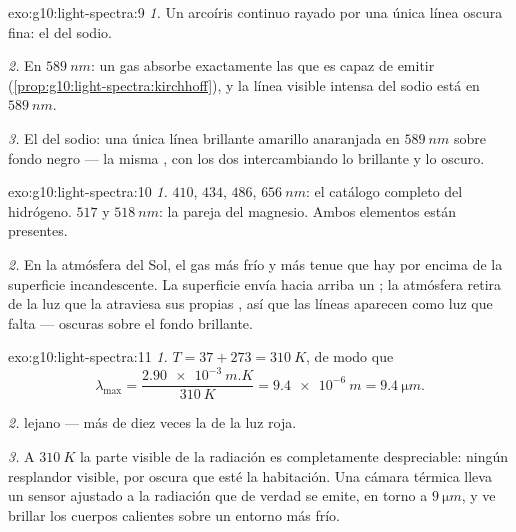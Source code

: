 \begin{solution}{exo:g10:light-spectra:9}
\emph{1.} Un arcoíris continuo rayado por una única línea oscura fina:
el  del sodio.

\emph{2.} En $\qty{589}{nm}$: un gas absorbe exactamente las  que es capaz de emitir
(\cref{prop:g10:light-spectra:kirchhoff}), y la línea visible intensa
del sodio está en $\qty{589}{nm}$.

\emph{3.} El  del sodio: una única línea brillante
amarillo anaranjada en $\qty{589}{nm}$ sobre fondo negro --- la misma
, con los dos  intercambiando lo brillante y lo
oscuro.
\end{solution}

\begin{solution}{exo:g10:light-spectra:10}
\emph{1.} $410$, $434$, $486$, $\qty{656}{nm}$: el catálogo completo del
hidrógeno. $517$ y $\qty{518}{nm}$: la pareja del magnesio. Ambos
elementos están presentes.

\emph{2.} En la atmósfera del Sol, el gas más frío y más tenue que hay
por encima de la superficie incandescente. La superficie envía hacia
arriba un ; la atmósfera retira de la luz que la
atraviesa sus propias , así que las líneas aparecen
como luz que falta --- oscuras sobre el fondo brillante.
\end{solution}

\begin{solution}{exo:g10:light-spectra:11}
\emph{1.} $T = 37 + 273 = \qty{310}{K}$, de modo que
\[
\lambda_{\max} = \frac{\qty{2.90e-3}{m.K}}{\qty{310}{K}}
= \qty{9.4e-6}{m} = \qty{9.4}{\micro m}.
\]

\emph{2.}  lejano --- más de diez veces la  de
la luz roja.

\emph{3.} A $\qty{310}{K}$ la parte visible de la radiación es
completamente despreciable: ningún resplandor visible, por oscura que
esté la habitación. Una cámara térmica lleva un sensor ajustado a la
radiación que de verdad se emite, en torno a $\qty{9}{\micro m}$, y ve
brillar los cuerpos calientes sobre un entorno más frío.
\end{solution}

